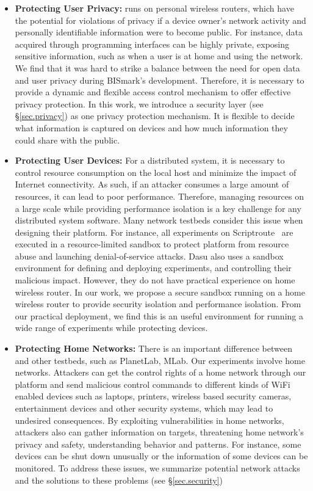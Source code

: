 \begin{itemize}
\item \textbf{Protecting User Privacy:} \sysname runs on personal wireless routers, which have the potential for violations of privacy if a device owner's network activity and personally identifiable information were to become public. For instance, data acquired through programming interfaces can be highly private, exposing sensitive information, such as when a user is at home and using the network. We find that it was hard to strike a balance between the need for open data and user privacy during BISmark's development. Therefore, it is necessary to provide a dynamic and flexible access control mechanism to offer effective privacy protection. In this work, we introduce a security layer (see \S{\ref{sec.privacy}}) as one privacy protection mechanism. It is flexible to decide what information is captured on devices and how much information they could share with the public. 

\item \textbf{Protecting User Devices:} For a distributed system, it is necessary to control resource consumption on the local host and minimize the impact of Internet connectivity. As such, if an attacker consumes a large amount of resources, it can lead to poor performance. Therefore, managing resources on a large scale while providing performance isolation is a key challenge for any distributed system software. Many network testbeds consider this issue when designing their platform. For instance, all experiments on Scriptroute~\cite{spring2003scriptroute} are executed in a resource-limited sandbox to protect platform from resource abuse and launching denial-of-service attacks. Dasu also uses a sandbox environment for defining and deploying experiments, and controlling their malicious impact. However, they do not have practical experience on home wireless router. In our work, we propose a secure sandbox running on a home wireless router to provide security isolation and performance isolation. From our practical deployment, we find this is an useful environment for running a wide range of experiments while protecting devices.

\item \textbf{Protecting Home Networks:} There is an important difference between \sysname and other testbeds, such as PlanetLab, MLab. Our experiments involve home networks. Attackers can get the control rights of a home network through our platform and send malicious control commands to different kinds of WiFi enabled devices such as laptops, printers, wireless based security cameras, entertainment devices and other security systems, which may lead to undesired consequences. By exploiting vulnerabilities in home networks, attackers also can gather information on targets, threatening home network's privacy and safety, understanding behavior and patterns. For instance, some devices can be shut down unusually or the information of some devices can be monitored. To address these issues, we summarize potential network attacks and the solutions to these problems (see \S{\ref{sec.security}})
\end{itemize}

